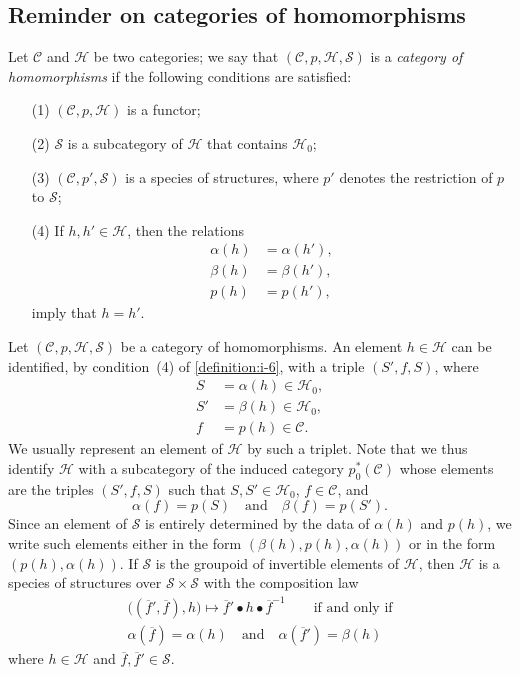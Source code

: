 \documentclass[a4paper,fleqn]{article}
\theoremstyle{plain}
\theoremstyle{definition}
\newenvironment{definition}[1]
  {\renewcommand\theinnerdefinition{#1}\innerdefinition}
  {\endinnerdefinition}
\newcommand{\oldpage}[1]{{\marginpar{\footnotesize$\bigg\vert$\,\,\,\,\textit{p.~#1}}}}
\newcommand{\textand}{\quad\text{and}\quad}
\newcommand{\CC}{\mathcal{C}}
\newcommand{\HH}{\mathcal{H}}
\renewcommand{\SS}{\mathcal{S}}
\newcommand{\smallbullet}{\bullet}
\begin{document}
\subsection{Reminder on categories of homomorphisms}
\label{section:i.4}

\begin{definition}{6}
\label{definition:i-6}
  Let $\CC$ and $\HH$ be two categories;
  we say \cite{3a} that $(\CC,p,\HH,\SS)$ is a \emph{category of homomorphisms} if the following conditions are satisfied:
  \begin{enumerate}
    \item[\normalfont(1)]
      $(\CC,p,\HH)$ is a functor;
    \item[\normalfont(2)]
      \oldpage{357}
      $\SS$ is a subcategory of $\HH$ that contains $\HH_0$;
    \item[\normalfont(3)]
      $(\CC,p',\SS)$ is a species of structures, where $p'$ denotes the restriction of $p$ to $\SS$;
    \item[\normalfont(4)]
      If $h,h'\in\HH$, then the relations
      \[
        \begin{aligned}
          \alpha(h)
          &= \alpha(h'),
        \\\beta(h)
          &= \beta(h'),
        \\p(h)
          &= p(h'),
        \end{aligned}
      \]
      imply that $h=h'$.
  \end{enumerate}
\end{definition}

Let $(\CC,p,\HH,\SS)$ be a category of homomorphisms.
An element $h\in\HH$ can be identified, by condition~(4) of \cref{definition:i-6}, with a triple $(S',f,S)$, where
\[
  \begin{aligned}
    S
    &= \alpha(h) \in\HH_0,
  \\S'
    &= \beta(h) \in\HH_0,
  \\f
    &= p(h)\in\CC.
  \end{aligned}
\]
We usually represent an element of $\HH$ by such a triplet.
Note that we thus identify $\HH$ with a subcategory of the induced category $p_0^*(\CC)$ whose elements are the triples $(S',f,S)$ such that $S,S'\in\HH_0$, $f\in\CC$, and
\[
  \alpha(f)=p(S)
  \textand
  \beta(f)=p(S').
\]
Since an element of $\SS$ is entirely determined by the data of $\alpha(h)$ and $p(h)$, we write such elements either in the form $(\beta(h),p(h),\alpha(h))$ or in the form $(p(h),\alpha(h))$.
If $\SS$ is the groupoid of invertible elements of $\HH$, then $\HH$ is a species of structures over $\SS\times\SS$ with the composition law
\[
  \begin{gathered}
    \big((\overline{f}',\overline{f}),h\big)
    \longmapsto\overline{f}'\smallbullet h\smallbullet\overline{f}^{-1}
    \qquad\text{if and only if}
  \\\alpha(\overline{f})=\alpha(h)
    \textand
    \alpha(\overline{f}')=\beta(h)
  \end{gathered}
\]
where $h\in\HH$ and $\overline{f},\overline{f}'\in\SS$.
\end{document}
